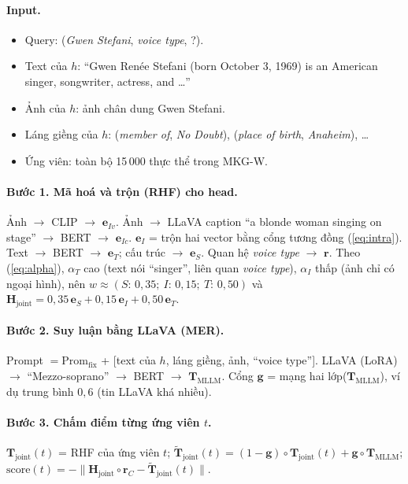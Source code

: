 \documentclass[11pt,a4paper]{article}
\newcommand{\Hj}{\mathbf{H}_{\mathrm{joint}}}
\newcommand{\Tj}{\mathbf{T}_{\mathrm{joint}}}
\newcommand{\Tjt}{\tilde{\mathbf{T}}_{\mathrm{joint}}}
\newcommand{\Tm}{\mathbf{T}_{\mathrm{MLLM}}}
\newcommand{\score}{\mathrm{score}}
\newcommand{\Prom}{\mathrm{Prom}}
\newcommand{\Ent}[1]{\textit{#1}}
\begin{document}
\paragraph{Input.}
\begin{itemize}
\item Query: (\Ent{Gwen Stefani}, \Ent{voice type}, ?).
\item Text của $h$: ``Gwen Renée Stefani (born October 3, 1969) is an American singer, songwriter, actress, and \ldots''
\item Ảnh của $h$: ảnh chân dung Gwen Stefani.
\item Láng giềng của $h$: (\Ent{member of}, \Ent{No Doubt}), (\Ent{place of birth}, \Ent{Anaheim}), \ldots
\item Ứng viên: toàn bộ 15\,000 thực thể trong MKG-W.
\end{itemize}

\paragraph{Bước 1. Mã hoá và trộn (RHF) cho head.}
Ảnh $\rightarrow$ CLIP $\rightarrow$ $\mathbf{e}_{Iv}$. Ảnh $\rightarrow$ LLaVA caption ``a blonde woman singing on stage'' $\rightarrow$ BERT $\rightarrow$ $\mathbf{e}_{Ic}$. $\mathbf{e}_I$ = trộn hai vector bằng cổng tương đồng (\ref{eq:intra}). Text $\rightarrow$ BERT $\rightarrow$ $\mathbf{e}_T$; cấu trúc $\rightarrow$ $\mathbf{e}_S$. Quan hệ \Ent{voice type} $\rightarrow$ $\mathbf{r}$. Theo (\ref{eq:alpha}), $\alpha_T$ cao (text nói ``singer'', liên quan \Ent{voice type}), $\alpha_I$ thấp (ảnh chỉ có ngoại hình), nên $w \approx (S{:}\,0{,}35;\ I{:}\,0{,}15;\ T{:}\,0{,}50)$ và
$\Hj = 0{,}35\,\mathbf{e}_S + 0{,}15\,\mathbf{e}_I + 0{,}50\,\mathbf{e}_T$.

\paragraph{Bước 2. Suy luận bằng LLaVA (MER).}
Prompt $= \Prom_{\mathrm{fix}}$ + [text của $h$, láng giềng, ảnh, ``voice type'']. LLaVA (LoRA) $\rightarrow$ ``Mezzo-soprano'' $\rightarrow$ BERT $\rightarrow$ $\Tm$. Cổng $\mathbf{g}$ = mạng hai lớp($\Tm$), ví dụ trung bình $0{,}6$ (tin LLaVA khá nhiều).

\paragraph{Bước 3. Chấm điểm từng ứng viên $t$.}
$\Tj(t)$ = RHF của ứng viên $t$; $\Tjt(t) = (1-\mathbf{g}) \circ \Tj(t) + \mathbf{g} \circ \Tm$; $\score(t) = -\|\Hj \circ \mathbf{r}_C - \Tjt(t)\|$.
\end{document}
